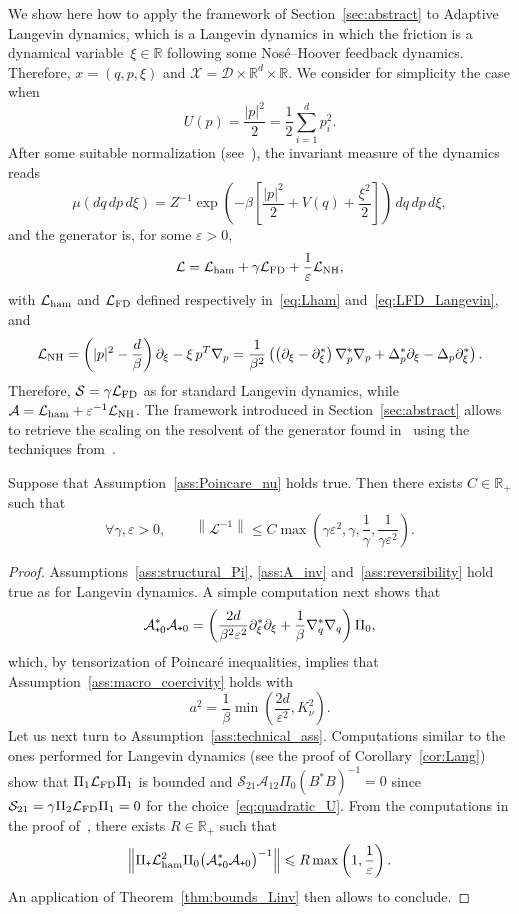 \documentclass[AHL,Unicode,longabstracts,MathTools,published]{cedram}
\newcommand{\cL}{\mathcal{L}}
\newcommand{\cLs}{\mathcal{S}}
\newcommand{\cLa}{\mathcal{A}}
\newcommand{\cX}{\mathcal{X}}
\newcommand{\cD}{\mathcal{D}}
\newcommand{\R}{\mathbb{R}}
\newcommand{\cLham}{\mathcal{L}_{\rm ham}}
\newcommand{\cLFD}{\mathcal{L}_{\rm FD}}
\newcommand{\subplus}{\textnormal{\texttt{+}}}
\renewcommand{\leq}{\leqslant}
\newcommand{\cLNH}{\cL_{\rm NH}}
\let\oldforall\forall
\renewcommand*{\forall}{\mathrel{\oldforall}}
\begin{document}
We show here how to apply the framework of Section~\ref{sec:abstract} to Adaptive Langevin dynamics, which is a Langevin dynamics in which the friction is a dynamical variable~$\xi \in \R$ following some Nosé--Hoover feedback dynamics. Therefore, $x = (q,p,\xi)$ and $\cX = \cD \times \R^d \times \R$. We consider for simplicity the case when
\begin{equation}\label{eq:quadratic_U}
U(p) = \frac{|p|^2}{2} = \frac12 \sum_{i=1}^d p_i^2.
\end{equation}
After some suitable normalization (see~\cite{LSS19}), the invariant measure of the dynamics reads
\[
\mu(dq \, dp \, d\xi) = Z^{-1} \exp\left(-\beta \left [\frac{|p|^2}{2} + V(q) + \frac{\xi^2}{2} \right]\right) \, dq \, dp \, d\xi,
\]
and the generator is, for some $\varepsilon > 0$,
\[
\cL = \cLham + \gamma \cLFD + \frac{1}{\varepsilon} \cLNH,
\]
with $\cLham$ and $\cLFD$ defined respectively in~\eqref{eq:Lham} and~\eqref{eq:LFD_Langevin}, and
\[
\cLNH = \left (|p|^{2} - \frac{d}{\beta} \right) \partial_{\xi} - \xi\, p^T \nabla_{p} = \frac{1}{\beta^2} \left(\left(\partial_\xi-\partial_\xi^*\right)\nabla_p^*\nabla_p + \Delta_p^*\partial_\xi - \Delta_p\partial_\xi^* \right).
\]
Therefore, $\cLs = \gamma \cLFD$ as for standard Langevin dynamics, while $\cLa = \cLham + \varepsilon^{-1} \cLNH$. The framework introduced in Section~\ref{sec:abstract} allows to retrieve the scaling on the resolvent of the generator found in~\cite{LSS19} using the techniques from~\cite{DMS15,Herau06}.

\begin{prop}
Suppose that Assumption~\ref{ass:Poincare_nu} holds true. Then there exists $C \in \R_+$ such that
\[
\forall \gamma,\varepsilon>0, \qquad \left\|\cL^{-1}\right\| \leq C\max\left(\gamma\varepsilon^2,\gamma,\frac1\gamma,\frac{1}{\gamma\varepsilon^2}\right).
\]
\end{prop}

\begin{proof}
Assumptions~\ref{ass:structural_Pi}, \ref{ass:A_inv} and~\ref{ass:reversibility} hold true as for Langevin dynamics. A simple computation next shows that
\[
\cLa_{\subplus 0}^*\cLa_{\subplus 0} = \left (\frac{2d}{\beta^2 \varepsilon^2} \partial_{\xi}^{*}\partial_{\xi} + \frac1\beta \nabla_{q}^{*}\nabla_{q} \right) \Pi_0,
\]
which, by tensorization of Poincaré inequalities, implies that Assumption~\ref{ass:macro_coercivity} holds with
\[
a^2 = \frac1\beta \min\left(\frac{2d}{\varepsilon^2},K_\nu^2\right).
\]
Let us next turn to Assumption~\ref{ass:technical_ass}. Computations similar to the ones performed for Langevin dynamics (see the proof of Corollary~\ref{cor:Lang}) show that $\Pi_1 \cLFD \Pi_1$ is bounded and $\cLs_{21} \cLa_{12} \Pi_0 (B^* B)^{-1} = 0$ since $\cLs_{21} = \gamma \Pi_2 \cLFD \Pi_1 = 0$ for the choice~\eqref{eq:quadratic_U}. From the computations in the proof of~\cite[Lemma~2.7]{LSS19}, there exists $R \in \R_+$ such that
\[
\left\| \Pi_\subplus\cLham^2 \Pi_0 \big(\cLa_{\subplus 0}^*\cLa_{\subplus 0}\big)^{-1} \right\| \leq R \max\left(1,\frac1\varepsilon\right).
\]
An application of Theorem~\ref{thm:bounds_Linv} then allows to conclude.
\end{proof}
\end{document}

